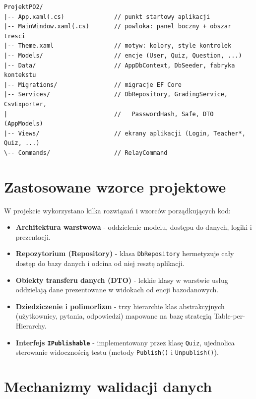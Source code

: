 \begin{lstlisting}[caption={Struktura katalogów projektu.}, label=lst:foldery]
ProjektPO2/
|-- App.xaml(.cs)              // punkt startowy aplikacji
|-- MainWindow.xaml(.cs)       // powloka: panel boczny + obszar tresci
|-- Theme.xaml                 // motyw: kolory, style kontrolek
|-- Models/                    // encje (User, Quiz, Question, ...)
|-- Data/                      // AppDbContext, DbSeeder, fabryka kontekstu
|-- Migrations/                // migracje EF Core
|-- Services/                  // DbRepository, GradingService, CsvExporter,
|                              //   PasswordHash, Safe, DTO (AppModels)
|-- Views/                     // ekrany aplikacji (Login, Teacher*, Quiz, ...)
\-- Commands/                  // RelayCommand
\end{lstlisting}

\section{Zastosowane wzorce projektowe}
\label{sec:wzorce}

W projekcie wykorzystano kilka rozwiązań i wzorców porządkujących kod:

\begin{itemize}
  \item \textbf{Architektura warstwowa} - oddzielenie modelu, dostępu do danych, logiki i prezentacji.
  \item \textbf{Repozytorium (Repository)} - klasa \texttt{DbRepository} hermetyzuje cały dostęp do
        bazy danych i odcina od niej resztę aplikacji.
  \item \textbf{Obiekty transferu danych (DTO)} - lekkie klasy w warstwie usług oddzielają dane
        prezentowane w widokach od encji bazodanowych.
  \item \textbf{Dziedziczenie i polimorfizm} - trzy hierarchie klas abstrakcyjnych (użytkownicy,
        pytania, odpowiedzi) mapowane na bazę strategią Table-per-Hierarchy.
  \item \textbf{Interfejs \texttt{IPublishable}} - implementowany przez klasę \texttt{Quiz},
        ujednolica sterowanie widocznością testu (metody \texttt{Publish()} i \texttt{Unpublish()}).
\end{itemize}

\section{Mechanizmy walidacji danych}
\label{sec:walidacja}

